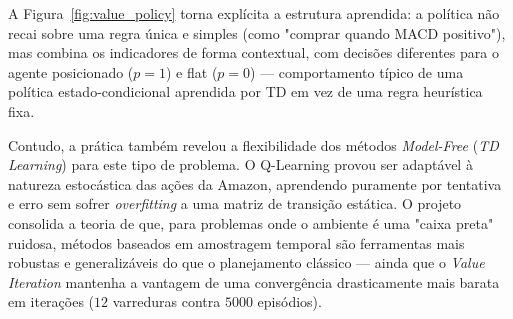 \documentclass{article}
\begin{document}
A Figura~\ref{fig:value_policy} torna explícita a estrutura aprendida: a política não recai sobre uma regra única e simples (como "comprar quando MACD positivo"), mas combina os indicadores de forma contextual, com decisões diferentes para o agente posicionado ($p=1$) e flat ($p=0$) — comportamento típico de uma política estado-condicional aprendida por TD em vez de uma regra heurística fixa.

Contudo, a prática também revelou a flexibilidade dos métodos \textit{Model-Free} (\textit{TD Learning}) para este tipo de problema. O Q-Learning provou ser adaptável à natureza estocástica das ações da Amazon, aprendendo puramente por tentativa e erro sem sofrer \textit{overfitting} a uma matriz de transição estática. O projeto consolida a teoria de que, para problemas onde o ambiente é uma "caixa preta" ruidosa, métodos baseados em amostragem temporal são ferramentas mais robustas e generalizáveis do que o planejamento clássico — ainda que o \textit{Value Iteration} mantenha a vantagem de uma convergência drasticamente mais barata em iterações ($12$ varreduras contra $5000$ episódios).
\end{document}
